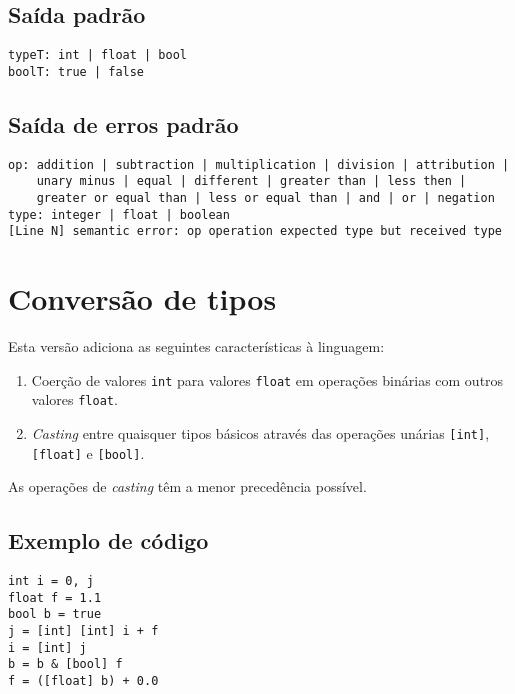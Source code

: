 \documentclass{sftex/sftex}
\newenvironment{smallenum}{
    \vspace{-1mm}
    \begin{enumerate}[label=\roman*.]
    \setlength{\parskip}{0pt}
    \setlength{\itemsep}{2pt}
}{
    \vspace{-2mm}
    \end{enumerate}
}
\begin{document}
\subsection{Saída padrão}

\begin{verbatim}
typeT: int | float | bool
boolT: true | false
\end{verbatim}

\subsection{Saída de erros padrão}

\begin{verbatim}
op: addition | subtraction | multiplication | division | attribution |
    unary minus | equal | different | greater than | less then |
    greater or equal than | less or equal than | and | or | negation
type: integer | float | boolean
[Line N] semantic error: op operation expected type but received type
\end{verbatim}

\section{Conversão de tipos}

Esta versão adiciona as seguintes características à linguagem:

\begin{smallenum}

\item Coerção de valores \verb!int! para valores \verb!float! em
    operações binárias com outros valores \verb!float!.

\item \emph{Casting} entre quaisquer tipos básicos através das operações
    unárias \verb![int]!, \verb![float]! e \verb![bool]!.

\end{smallenum}

As operações de \emph{casting} têm a menor precedência possível.

\subsection{Exemplo de código}

\begin{verbatim}
int i = 0, j
float f = 1.1
bool b = true
j = [int] [int] i + f
i = [int] j
b = b & [bool] f
f = ([float] b) + 0.0
\end{verbatim}
\end{document}
